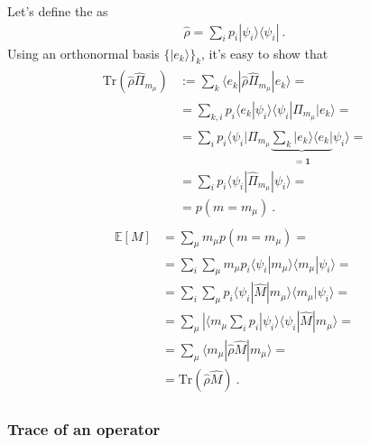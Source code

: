 \documentclass[letterpaper,10pt,english]{jupyterBook}
\begin{document}
\sphinxAtStartPar
Let’s define the  as
\begin{equation*}
\begin{split}\hat{\rho} = \sum_i p_i | \psi_i \rangle \langle \psi_i | \ .\end{split}
\end{equation*}
\sphinxAtStartPar
Using an orthonormal basis \(\{ | e_k \rangle \}_k\), it’s easy to show that
\begin{equation*}
\begin{split}\begin{aligned}
  \text{Tr}\left( \hat{\rho} \hat{\Pi}_{m_{\mu}} \right) 
  & := \sum_k \langle e_k | \hat{\rho} \hat{\Pi}_{m_{\mu}} | e_k \rangle = \\
  & = \sum_{k,i} p_i \langle e_k | \psi_i \rangle \langle \psi_i | \hat{\Pi}_{m_{\mu}} | e_k \rangle = \\
  & = \sum_{i} p_i \langle \psi_i | \hat{\Pi}_{m_{\mu}} \underbrace{\sum_k | e_k \rangle \langle e_k |}_{ = \hat{\mathbf{1}} } \psi_i \rangle = \\
  & = \sum_{i} p_i \langle \psi_i | \hat{\Pi}_{m_{\mu}} | \psi_i \rangle = \\
  & = p(m = m_{\mu}) \ .
\end{aligned}\end{split}
\end{equation*}
\sphinxAtStartPar
{}
\begin{equation*}
\begin{split}\begin{aligned}
 \mathbb{E}[ M ]
 & = \sum_{\mu} m_{\mu} p ( m = m_{\mu} ) = \\
 & = \sum_i \sum_{\mu} m_{\mu} p_i \langle \psi_i | m_{\mu} \rangle \langle m_{\mu} | \psi_i \rangle = \\
 & = \sum_i \sum_{\mu} p_i \langle \psi_i | \hat{M} | m_{\mu} \rangle \langle m_{\mu} | \psi_i \rangle = \\
 & = \sum_{\mu} | \langle m_{\mu} \sum_i  p_i| \psi_i \rangle\langle \psi_i | \hat{M} | m_{\mu} \rangle = \\
 & = \sum_{\mu} \langle m_{\mu} | \hat{\rho} \hat{M} | m_{\mu} \rangle = \\
 & = \text{Tr} \left( \hat{\rho} \hat{M} \right) \ .
\end{aligned}\end{split}
\end{equation*}\subsubsection*{Trace of an operator}
\end{document}
